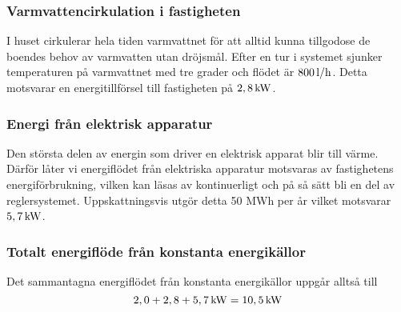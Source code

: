 \subsubsection{Varmvattencirkulation i fastigheten}
I huset cirkulerar hela tiden varmvattnet för att alltid kunna tillgodose de boendes behov av varmvatten utan dröjsmål. Efter en tur i systemet sjunker temperaturen på varmvattnet med tre grader och flödet är $\unit[800]{l/h}$. Detta motsvarar en energitillförsel till fastigheten på $\unit[2,8]{kW}$.

\subsubsection{Energi från elektrisk apparatur}
Den största delen av energin som driver en elektrisk apparat blir till värme. Därför låter vi energiflödet från elektriska apparatur motsvaras av fastighetens energiförbrukning, vilken kan läsas av kontinuerligt och på så sätt bli en del av reglersystemet. Uppskattningsvis utgör detta 50 MWh per år vilket motsvarar $\unit[5,7]{kW}$.

\subsubsection{Totalt energiflöde från konstanta energikällor}
Det sammantagna energiflödet från konstanta energikällor uppgår alltså till 
\begin{equation}
\unit[2,0+2,8+5,7]{kW} =\unit[10,5]{kW}
\end{equation}


